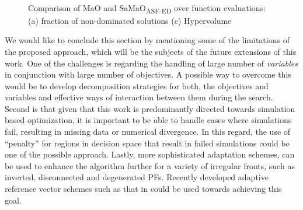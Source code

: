\documentclass[twocolumn,10pt]{asme2ej}
\begin{document}
\begin{figure}[!htb]
	\centering    
	\\
	\caption{Comparison of MaO and SaMaO\textsubscript{ASF-ED} over function evaluations: (a) fraction of non-dominated solutions (c) Hypervolume}
	\label{fig:nd}
\end{figure}


{\color{blue}
We would like to conclude this section by mentioning some of the limitations of the proposed approach, which will be the subjects of the future extensions of this work. One of the challenges is regarding the handling of large number of \emph{variables} in conjunction with large number of objectives. A possible way to overcome this would be to develop decomposition strategies for both, the objectives and variables and effective ways of interaction between them during the search. Second is that given that this work is predominantly directed towards simulation based optimization, it is important to be able to handle cases where simulations fail, resulting in missing data or numerical divergence. In this regard, the use of ``penalty'' for regions in decision space that result in failed simulations could be one of the possible approach. Lastly, more sophisticated adaptation schemes, can be used to enhance the algorithm further for a variety of irregular fronts, such as inverted, disconnected and degenerated PFs. Recently developed adaptive reference vector schemes such as that in \cite{asaf2017enhanced} could be used towards achieving this goal.  
}
\end{document}
